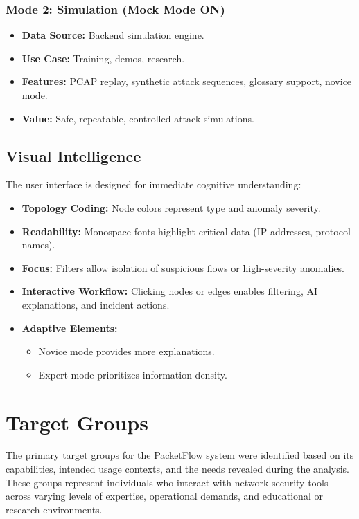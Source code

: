 \documentclass[
    11pt, 
    a4paper, 
    parskip=half, 
    headsepline,       %
    DIV=12             %
]{scrartcl}
\begin{document}
\subsubsection*{Mode 2: Simulation (Mock Mode ON)}
\begin{itemize}
    \item \textbf{Data Source:} Backend simulation engine.
    \item \textbf{Use Case:} Training, demos, research.
    \item \textbf{Features:} PCAP replay, synthetic attack sequences, glossary support, novice mode.
    \item \textbf{Value:} Safe, repeatable, controlled attack simulations.
\end{itemize}

\subsection{Visual Intelligence}
The user interface is designed for immediate cognitive understanding:
\begin{itemize}
    \item \textbf{Topology Coding:} Node colors represent type and anomaly severity.
    \item \textbf{Readability:} Monospace fonts highlight critical data (IP addresses, protocol names).
    \item \textbf{Focus:} Filters allow isolation of suspicious flows or high-severity anomalies.
    \item \textbf{Interactive Workflow:} Clicking nodes or edges enables filtering, AI explanations, and incident actions.
    \item \textbf{Adaptive Elements:}
        \begin{itemize}[label=\textcolor{pfCyan}{$\circ$}]
            \item Novice mode provides more explanations.
            \item Expert mode prioritizes information density.
        \end{itemize}
\end{itemize}

\section{Target Groups}

The primary target groups for the PacketFlow system were identified based on its capabilities, intended usage contexts, and the needs revealed during the analysis. These groups represent individuals who interact with network security tools across varying levels of expertise, operational demands, and educational or research environments.
\end{document}
